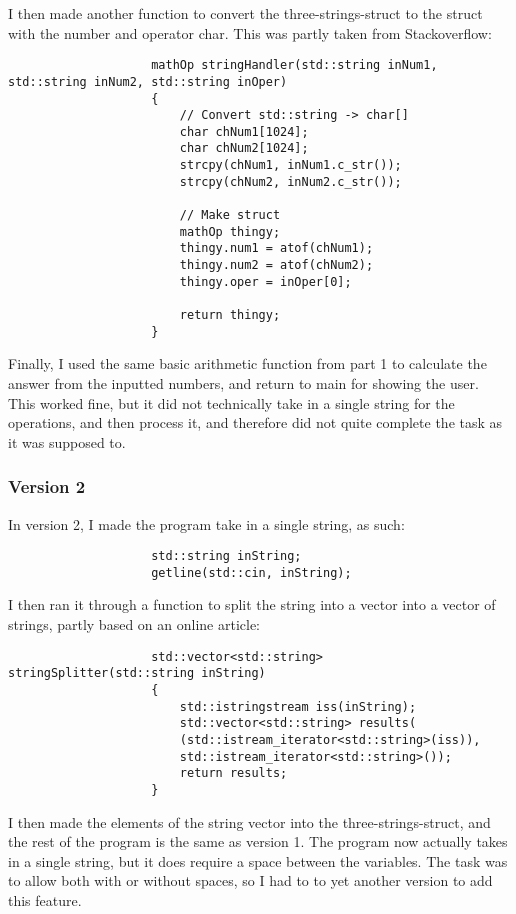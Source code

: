 \documentclass{article}
\begin{document}
				I then made another function to convert the three-strings-struct to the struct with the number and operator char. This was partly taken from Stackoverflow:
				\cite{cppConvStr2Chr}
				\begin{lstlisting}
					mathOp stringHandler(std::string inNum1, std::string inNum2, std::string inOper)
					{
						// Convert std::string -> char[]
						char chNum1[1024];
						char chNum2[1024];
						strcpy(chNum1, inNum1.c_str());
						strcpy(chNum2, inNum2.c_str());
						
						// Make struct
						mathOp thingy;
						thingy.num1 = atof(chNum1);
						thingy.num2 = atof(chNum2);
						thingy.oper = inOper[0];
						
						return thingy;
					}
				\end{lstlisting}
				
				Finally, I used the same basic arithmetic function from part 1 to calculate the answer from the inputted numbers, and return to main for showing the user. \\
				This worked fine, but it did not technically take in a single string for the operations, and then process it, and therefore did not quite complete the task as it was supposed to.
		
		
			\subsubsection{Version 2}
				In version 2, I made the program take in a single string, as such:
				\begin{lstlisting}
					std::string inString;
					getline(std::cin, inString);
				\end{lstlisting}
				
				I then ran it through a function to split the string into a vector into a vector of strings, partly based on an online article: \cite{cppSplitStr}
				\begin{lstlisting}
					std::vector<std::string> stringSplitter(std::string inString)
					{
						std::istringstream iss(inString);
						std::vector<std::string> results(
						(std::istream_iterator<std::string>(iss)),
						std::istream_iterator<std::string>());
						return results;
					}
				\end{lstlisting}
				
				I then made the elements of the string vector into the three-strings-struct, and the rest of the program is the same as version 1. The program now actually takes in a single string, but it does require a space between the variables. The task was to allow both with or without spaces, so I had to to yet another version to add this feature.
			
\end{document}
